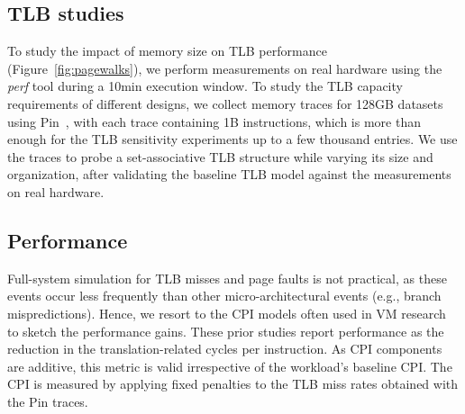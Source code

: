 \subsection{TLB studies}
To study the impact of memory size on  TLB performance (Figure~\ref{fig:pagewalks}), we perform measurements on real hardware using the \textit{perf} tool during a 10min execution window. To study the TLB capacity requirements of different designs, we collect memory traces for 128GB datasets using Pin~\cite{luk:pin}, with each trace containing 1B instructions, which is more than enough for the TLB sensitivity experiments up to a few thousand entries. We use the traces to probe a set-associative TLB structure while varying its size and organization, after validating the baseline TLB model against the measurements on real hardware. 

\subsection{Performance}
Full-system simulation for TLB misses and page faults is not practical, as these events occur less frequently than other micro-architectural events (e.g., branch mispredictions). Hence, we resort to the CPI models often used in VM research~\cite{papadopoulou:prediction-based, saulsbury:recently-based, bhattacharjee:shared} to sketch the performance gains. These prior studies report performance as the reduction in the translation-related cycles per instruction. As CPI components are additive, this metric is valid irrespective of the workload's baseline CPI. The CPI is measured by applying fixed penalties to the TLB miss rates obtained with the Pin traces. 



